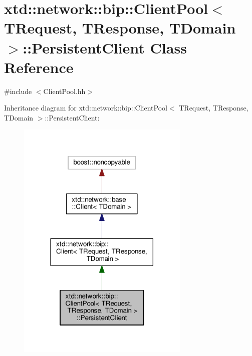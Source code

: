 \hypertarget{classxtd_1_1network_1_1bip_1_1ClientPool_1_1PersistentClient}{}\section{xtd\+:\+:network\+:\+:bip\+:\+:Client\+Pool$<$ T\+Request, T\+Response, T\+Domain $>$\+:\+:Persistent\+Client Class Reference}
\label{classxtd_1_1network_1_1bip_1_1ClientPool_1_1PersistentClient}


{\ttfamily \#include $<$Client\+Pool.\+hh$>$}



Inheritance diagram for xtd\+:\+:network\+:\+:bip\+:\+:Client\+Pool$<$ T\+Request, T\+Response, T\+Domain $>$\+:\+:Persistent\+Client\+:
\nopagebreak
\begin{figure}[H]
\begin{center}
\leavevmode
\includegraphics[width=233pt]{classxtd_1_1network_1_1bip_1_1ClientPool_1_1PersistentClient__inherit__graph}
\end{center}
\end{figure}



